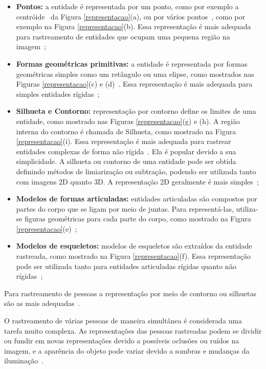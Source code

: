 	\begin{itemize}
		\item \textbf{Pontos:} a entidade é representada por um ponto, como por exemplo a centróide~\cite{veenman} da Figura \ref{representacao}(a), ou por vários pontos~\cite{serby}, como por exemplo na Figura \ref{representacao}(b). Essa representação é mais adequada para rastreamento de entidades que ocupam uma pequena região na imagem~\cite{yilmaz};

		\item \textbf{Formas geométricas primitivas:} a entidade é representada por formas geométricas simples como um retângulo ou uma elipse, como mostrados nas Figuras \ref{representacao}(c) e (d)~\cite{comaniciu}. Essa representação é mais adequada para simples entidades rígidas~\cite{yilmaz};

		\item \textbf{Silhueta e Contorno:} representação por contorno define os limites de uma entidade, como mostrado nas Figuras \ref{representacao}(g) e (h). A região interna do contorno é chamada de Silhueta, como mostrado na Figura \ref{representacao}(i). Essa representação é mais adequada para rastrear entidades complexas de forma não rígida~\cite{yilmaz, yilmaz2}. Ela é popular devido a sua simplicidade. A silhueta ou contorno de uma entidade pode ser obtida definindo métodos de limiarização ou subtração, podendo ser utilizada tanto com imagens 2D quanto 3D. A representação 2D geralmente é mais simples~\cite{moeslund};

		\item \textbf{Modelos de formas articuladas:} entidades articuladas são compostos por partes do corpo que se ligam por meio de juntas. Para representá-las, utiliza-se figuras geométricas para cada parte do corpo, como mostrado na Figura \ref{representacao}(e)~\cite{yilmaz};

		\item \textbf{Modelos de esqueletos:} modelos de esqueletos são extraídos da entidade rastreada, como mostrado na Figura \ref{representacao}(f). Essa representação pode ser utilizada tanto para entidades articuladas rígidas quanto não rígidas~\cite{yilmaz};
	\end{itemize}

	Para rastreamento de pessoas a representação por meio de contorno ou silhuetas são as mais adequadas~\cite{yilmaz}.

	O rastreamento de várias pessoas de maneira simultânea é considerada uma tarefa muito complexa. As representações das pessoas rastreadas podem se dividir ou fundir em novas representações devido a possíveis oclusões ou ruídos na imagem, e a aparência do objeto pode variar devido a sombras e mudanças da iluminação~\cite{moeslund}.

